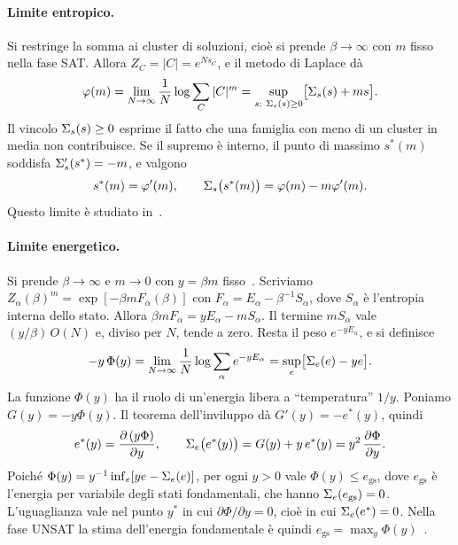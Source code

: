 \paragraph{Limite entropico.}
Si restringe la somma ai cluster di soluzioni, cioè si prende $\beta\to\infty$ con $m$ fisso nella fase SAT.
Allora $Z_C=|C|=e^{Ns_C}$, e il metodo di Laplace dà
\begin{equation}
\varphi(m)=\lim_{N\to\infty}\frac1N\log\sum_C|C|^{m}=\sup_{s:\ \Sig_s(s)\ge0}\bigl[\Sig_s(s)+ms\bigr].
\label{eq:phi-m}
\end{equation}
Il vincolo $\Sigma_s(s)\ge0$ esprime il fatto che una famiglia con meno di un cluster in media non contribuisce.
Se il supremo è interno, il punto di massimo $s^*(m)$ soddisfa $\Sigma_s'(s^*)=-m$, e valgono
\begin{equation}
s^*(m)=\varphi'(m),\qquad \Sigma_s\bigl(s^*(m)\bigr)=\varphi(m)-m\varphi'(m).
\label{eq:legendre-m}
\end{equation}
Questo limite è studiato in~\citep{mezard2005landscape,krzakala2007clusters,montanari2008clusters}.

\paragraph{Limite energetico.}
Si prende $\beta\to\infty$ e $m\to0$ con $y=\beta m$ fisso~\citep{mezard2002random,mezard2003cavity}.
Scriviamo $Z_\alpha(\beta)^{m}=\exp[-\beta m F_\alpha(\beta)]$ con $F_\alpha=E_\alpha-\beta^{-1}S_\alpha$, dove $S_\alpha$ è l'entropia interna dello stato.
Allora $\beta mF_\alpha=yE_\alpha-mS_\alpha$.
Il termine $mS_\alpha$ vale $(y/\beta)\,O(N)$ e, diviso per $N$, tende a zero.
Resta il peso $e^{-yE_\alpha}$, e si definisce
\begin{equation}
-y\,\Phi(y)=\lim_{N\to\infty}\frac1N\log\sum_\alpha e^{-yE_\alpha}=\sup_{e}\bigl[\Sigma_e(e)-ye\bigr].
\label{eq:Phi-y}
\end{equation}
La funzione $\Phi(y)$ ha il ruolo di un'energia libera a ``temperatura'' $1/y$.
Poniamo $G(y)=-y\Phi(y)$.
Il teorema dell'inviluppo dà $G'(y)=-e^*(y)$, quindi
\begin{equation}
e^*(y)=\frac{\partial\,(y\Phi)}{\partial y},\qquad
\Sigma_e\bigl(e^*(y)\bigr)=G(y)+y\,e^*(y)=y^2\,\frac{\partial\Phi}{\partial y}.
\label{eq:legendre-y}
\end{equation}
Poiché $\Phi(y)=y^{-1}\inf_e[ye-\Sigma_e(e)]$, per ogni $y>0$ vale $\Phi(y)\le e_{\mathrm{gs}}$, dove $e_{\mathrm{gs}}$ è l'energia per variabile degli stati fondamentali, che hanno $\Sigma_e(e_{\mathrm{gs}})=0$.
L'uguaglianza vale nel punto $y^*$ in cui $\partial\Phi/\partial y=0$, cioè in cui $\Sigma_e(e^*)=0$.
Nella fase UNSAT la stima dell'energia fondamentale è quindi $e_{\mathrm{gs}}=\max_y\Phi(y)$~\citep{mezard2002random}.

